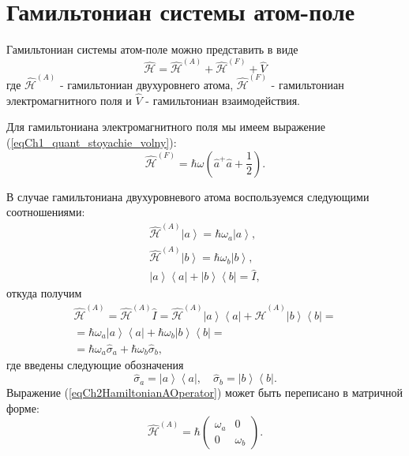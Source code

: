\section{Гамильтониан системы атом-поле}
Гамильтониан системы атом-поле можно представить в виде
\begin{equation}
\hat{\mathcal{H}} = \hat{\mathcal{H}}^{(A)} +
\hat{\mathcal{H}}^{(F)} + \hat{V}
\nonumber
\end{equation}
где
$\hat{\mathcal{H}}^{(A)}$ - гамильтониан двухуровнего атома,
$\hat{\mathcal{H}}^{(F)}$ - гамильтониан электромагнитного поля и
$\hat{V}$ - гамильтониан взаимодействия.

Для гамильтониана электромагнитного поля мы имеем выражение
(\ref{eqCh1_quant_stoyachie_volny}):
\begin{equation}
\hat{\mathcal{H}}^{(F)} = \hbar \omega 
\left(\hat{a}^{+}\hat{a} + \frac{1}{2}\right).
\nonumber
\end{equation}

В случае гамильтониана двухуровневого атома воспользуемся следующими
соотношениями:
\begin{eqnarray}
\hat{\mathcal{H}}^{(A)}\left|a\right> = \hbar \omega_a \left|a\right>,
\nonumber \\
\hat{\mathcal{H}}^{(A)}\left|b\right> = \hbar \omega_b \left|b\right>,
\nonumber \\
\left|a\right>\left<a\right| + \left|b\right>\left<b\right| = \hat{I},
\nonumber
\end{eqnarray}
откуда получим
\begin{eqnarray}
\hat{\mathcal{H}}^{(A)} = \hat{\mathcal{H}}^{(A)}\hat{I} = 
\hat{\mathcal{H}}^{(A)}
\left|a\right>\left<a\right| + \hat{\mathcal{H}}^{(A)}
\left|b\right>\left<b\right| =
\nonumber \\
 = 
\hbar\omega_a
\left|a\right>\left<a\right| + \hbar\omega_b
\left|b\right>\left<b\right| =
\nonumber \\
= \hbar \omega_a \hat{\sigma}_a +
\hbar \omega_b \hat{\sigma}_b,
\label{eqCh2HamiltonianAOperator}
\end{eqnarray}
где введены следующие обозначения
\begin{equation}
\hat{\sigma}_a = \left|a\right>\left<a\right|,
\quad
\hat{\sigma}_b = \left|b\right>\left<b\right|.
\nonumber
\end{equation}
Выражение (\ref{eqCh2HamiltonianAOperator}) может быть переписано в
матричной форме:
\begin{equation}
\hat{\mathcal{H}}^{(A)} = \hbar 
\left(
\begin{array} {cc}
\omega_a & 0  
\\
0 & \omega_b 
\end{array}
\right).
\label{eqCh2HamiltonianA}
\end{equation}

